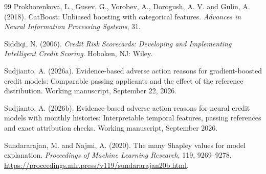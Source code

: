 \begin{thebibliography}{99}
Prokhorenkova, L., Gusev, G., Vorobev, A., Dorogush, A. V. and Gulin, A. (2018).
CatBoost: Unbiased boosting with categorical features.
\emph{Advances in Neural Information Processing Systems}, 31.

Siddiqi, N. (2006). \emph{Credit Risk Scorecards: Developing and Implementing Intelligent Credit
Scoring}. Hoboken, NJ: Wiley.

Sudjianto, A. (2026a). Evidence-based adverse action reasons for gradient-boosted credit models:
Comparable passing applicants and the effect of the reference distribution. Working manuscript,
September 22, 2026.

Sudjianto, A. (2026b). Evidence-based adverse action reasons for neural credit models with monthly
histories: Interpretable temporal features, passing references and exact attribution checks.
Working manuscript, September 2026.

Sundararajan, M. and Najmi, A. (2020). The many Shapley values for model explanation.
\emph{Proceedings of Machine Learning Research}, 119, 9269--9278.
\url{https://proceedings.mlr.press/v119/sundararajan20b.html}.

\end{thebibliography}
